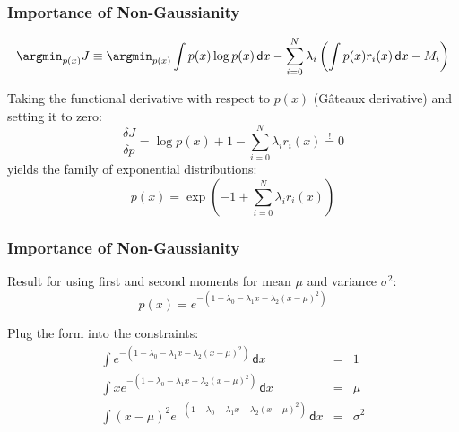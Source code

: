 \begin{frame}
  \frametitle{Importance of Non-Gaussianity \cont}


  {\small
  \begin{displaymath}
    \argmin_{p(x)} J \equiv 
    \argmin_{p(x)} \int p(x) \log p(x) \,\mathsf{d}x - \sum_{i = 0}^N \lambda_i \left( \int p(x) r_i(x) \,\mathsf{d}x - M_i \right)
  \end{displaymath}
  }
  \pause 
  
  Taking the functional derivative with respect to $p(x)$ (G\^{a}teaux derivative) and setting it to zero:
%
  {\small
  \begin{displaymath}
    \frac{\delta J}{\delta p} = \log p(x) + 1 - \sum_{i=0}^N \lambda_i r_i(x) \stackrel{!}{=} 0
  \end{displaymath}
  }
  \pause 
%  
  yields the family of exponential distributions:
%
  {\small
  \begin{displaymath}
    p(x) = \exp \left( -1 + \sum_{i=0}^N \lambda_i r_i(x) \right)
  \end{displaymath}
  }
\end{frame}


\begin{frame}
  \frametitle{Importance of Non-Gaussianity \cont}

  Result for using first and second moments for mean $\mu$ and variance $\sigma^2$:
  \begin{displaymath}
    p(x) = e^{-(1 - \lambda_0 - \lambda_1 x - \lambda_2 (x-\mu)^2)}
  \end{displaymath}
  \pause 
  
  Plug the form into the constraints:
  \begin{eqnarray*}
    \int e^{-(1 - \lambda_0 - \lambda_1 x - \lambda_2 (x-\mu)^2)} \,\mathsf{d}x &=& 1 \\
    \int x e^{-(1 - \lambda_0 - \lambda_1 x - \lambda_2 (x-\mu)^2)} \,\mathsf{d}x &=& \mu \\
    \int (x-\mu)^2 e^{-(1 - \lambda_0 - \lambda_1 x - \lambda_2 (x-\mu)^2)} \,\mathsf{d}x &=& \sigma^2
  \end{eqnarray*}
\end{frame}


